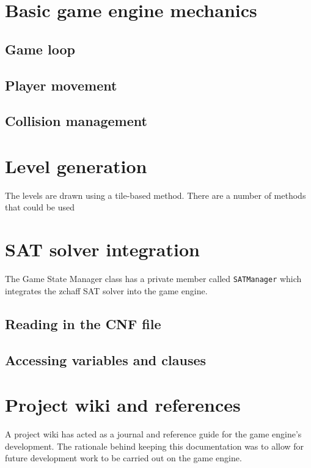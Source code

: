 \documentclass[11pt, a4paper, oneside]{report} %
\begin{document}
\section{Basic game engine mechanics}

\subsection{Game loop}

\subsection{Player movement}

\subsection{Collision management}

\section{Level generation}

The levels are drawn using a tile-based method. There are a number of methods
that could be used

\section{SAT solver integration}

The Game State Manager class has a private member called
\texttt{SAT\textunderscore Manager\textunderscore} which integrates the zchaff
SAT solver into the game engine.

\subsection{Reading in the CNF file}

\subsection{Accessing variables and clauses}

\section{Project wiki and references}

A project wiki has acted as a journal and reference guide for the game engine's
development. The rationale behind keeping this documentation was to allow for
future development work to be carried out on the game engine.
\end{document}
